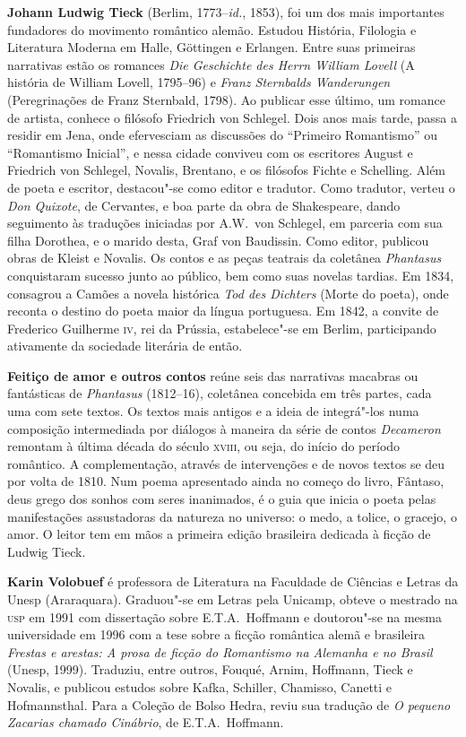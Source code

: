 
\textbf{Johann Ludwig Tieck} (Berlim, 1773--\textit{id.}, 1853), 
foi um dos mais importantes fundadores do movimento romântico alemão. 
Estudou História, Filologia e Literatura Moderna em Halle, 
Göttingen e Erlangen. Entre suas primeiras narrativas estão os romances 
\textit{Die Geschichte des Herrn William Lovell} (A história de William Lovell, 
1795--96) e \textit{Franz Sternbalds Wanderungen} 
(Peregrinações de Franz Sternbald, 1798). 
Ao publicar esse último, um romance de artista, conhece o filósofo 
Friedrich von Schlegel.  Dois anos mais tarde, passa a residir em Jena, 
onde efervesciam as  discussões do ``Primeiro Romantismo'' ou ``Romantismo 
Inicial'', e nessa  cidade conviveu com os escritores August e Friedrich von Schlegel, 
Novalis, Brentano, e os filósofos Fichte e Schelling. Além de poeta e escritor, destacou"-se 
como editor e tradutor. Como tradutor, verteu o \textit{Don Quixote}, de Cervantes, 
e boa parte da obra de Shakespeare, dando seguimento às traduções iniciadas 
por A.W.~von Schlegel, em parceria com sua filha Dorothea, e o marido desta,
Graf von Baudissin. Como editor, publicou obras de Kleist e Novalis.
Os contos e as peças teatrais da coletânea \textit{Phantasus} conquistaram 
sucesso junto ao público, bem como suas novelas tardias. Em 1834, consagrou 
a Camões a novela histórica \textit{Tod des Dichters} (Morte do poeta), onde 
reconta o destino do poeta maior da língua portuguesa. Em 1842, a convite 
de Frederico Guilherme \textsc{iv}, rei da Prússia, estabelece"-se em Berlim, 
participando ativamente da sociedade literária de então.

\textbf{Feitiço de amor e outros contos} reúne seis das narrativas macabras ou fantásticas de 
\textit{Phantasus} (1812--16), coletânea concebida em três partes, 
cada uma com sete textos. Os textos mais antigos e a ideia de integrá"-los 
numa composição intermediada por diálogos à maneira da série de contos 
\textit{Decameron} remontam à última década do século \textsc{xviii}, 
ou seja, do início do período romântico. A complementação, 
através de intervenções e de novos textos se deu por volta 
de 1810. Num poema apresentado ainda no começo do livro, Fântaso, 
deus grego dos sonhos com seres inanimados, é o guia que inicia o 
poeta pelas manifestações assustadoras da natureza no universo: 
o medo, a tolice, o gracejo, o amor. O leitor tem em mãos a primeira 
edição brasileira dedicada à ficção de Ludwig Tieck.   
        
\textbf{Karin Volobuef} é professora de Literatura na Faculdade de Ciências e
Letras da Unesp (Araraquara). Graduou"-se em Letras pela Unicamp, obteve
o mestrado na \textsc{usp} em 1991 com dissertação sobre E.T.A.~Hoffmann e doutorou"-se
na mesma universidade em 1996 com a tese sobre a ficção romântica alemã 
e brasileira \textit{Frestas e arestas: A prosa de ficção do Romantismo 
na Alemanha e no Brasil} (Unesp, 1999). Traduziu, entre outros, 
Fouqué, Arnim, Hoffmann, Tieck e Novalis, e publicou estudos sobre Kafka, 
Schiller, Chamisso, Canetti e Hofmannsthal. Para a Coleção de Bolso Hedra, 
reviu sua tradução de \textit{O pequeno Zacarias chamado Cinábrio}, de E.T.A.~Hoffmann. 

